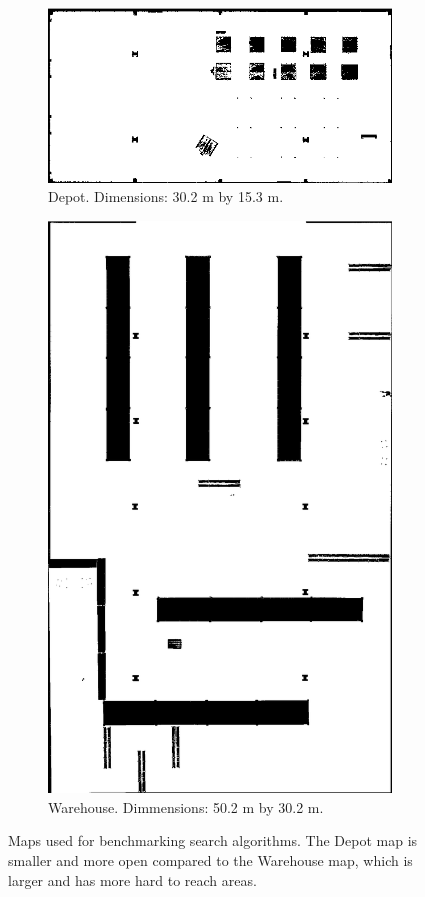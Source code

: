 \begin{figure}[H]
  \centering
  \begin{subfigure}[b]{0.46\textwidth}
    \centering
    \includegraphics[width=\textwidth]{./figures/depot.png}
    \caption{Depot. Dimensions: 30.2 m by 15.3 m.}
  \end{subfigure}
  \hfill
  \begin{subfigure}[b]{0.46\textwidth}
    \centering
    \includegraphics[height=\textwidth, angle=90]{./figures/warehouse.png}
    \caption{Warehouse. Dimmensions: 50.2 m by 30.2 m.}
  \end{subfigure}
  \caption{Maps used for benchmarking search algorithms. The Depot map is smaller and more open compared to the Warehouse map, which is larger and has more hard to reach areas.}
  \label{fig:bench-maps}
\end{figure}

